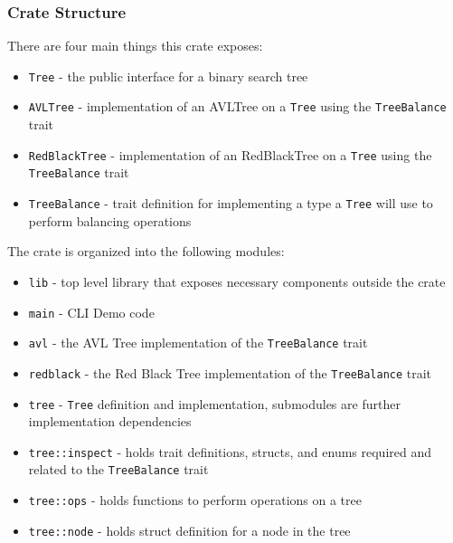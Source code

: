 \documentclass[11pt, letterpaper]{article}
\begin{document}
\subsubsection{Crate Structure}
There are four main things this crate exposes:
\begin{itemize}
    \item \texttt{Tree} - the public interface for a binary search tree
    \item \texttt{AVLTree} - implementation of an AVLTree on a \texttt{Tree} using the \texttt{TreeBalance} trait
    \item \texttt{RedBlackTree} - implementation of an RedBlackTree on a \texttt{Tree} using the \texttt{TreeBalance} trait
    \item \texttt{TreeBalance} - trait definition for implementing a type a \texttt{Tree} will use to perform balancing operations
\end{itemize}
\hfill \break
\noindent The crate is organized into the following modules:
\begin{itemize}
    \item \texttt{lib} - top level library that exposes necessary components outside the crate
    \item \texttt{main} - CLI Demo code
    \item \texttt{avl} - the AVL Tree implementation of the \texttt{TreeBalance} trait
    \item \texttt{redblack} - the Red Black Tree implementation of the \texttt{TreeBalance} trait
    \item \texttt{tree} - \texttt{Tree} definition and implementation, submodules are further implementation dependencies
    \item \texttt{tree::inspect} - holds trait definitions, structs, and enums required and related to the \texttt{TreeBalance} trait
    \item \texttt{tree::ops} - holds functions to perform operations on a tree
    \item \texttt{tree::node} - holds struct definition for a node in the tree
\end{itemize}
\end{document}
